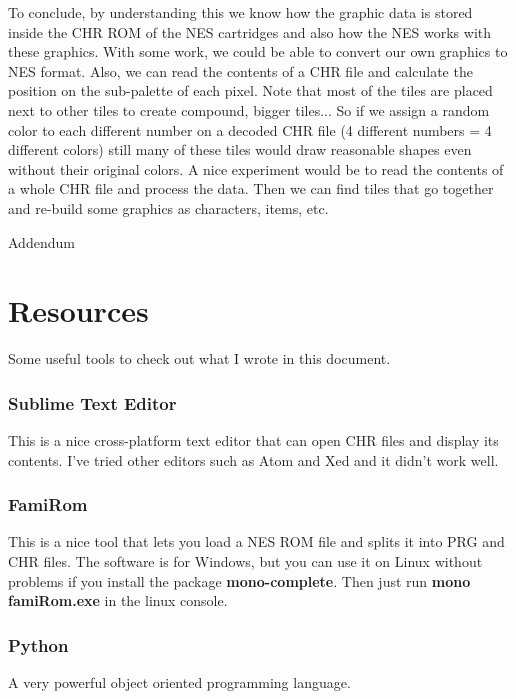 \documentclass{article}
\begin{document}
\vskip 0.2in

To conclude, by understanding this we know how the graphic data is stored inside the CHR ROM of the NES cartridges and also how the NES works with these graphics. With some work, we could be able to convert our own graphics to NES format. Also, we can read the contents of a CHR file and calculate the position on the sub-palette of each pixel. Note that most of the tiles are placed next to other tiles to create compound, bigger tiles... So if we assign a random color to each different number on a decoded CHR file (4 different numbers = 4 different colors) still many of these tiles would draw reasonable shapes even without their original colors. A nice experiment would be to read the contents of a whole CHR file and process the data. Then we can find tiles that go together and re-build some graphics as characters, items, etc.

\newpage

{\Huge Addendum}

\section*{Resources}

Some useful tools to check out what I wrote in this document.

\subsubsection*{Sublime Text Editor}
This is a nice cross-platform text editor that can open CHR files and display its contents. I've tried other editors such as Atom and Xed and it didn't work well.

\subsubsection*{FamiRom}

This is a nice tool that lets you load a NES ROM file and splits it into PRG and CHR files. The software is for Windows, but you can use it on Linux without problems if you install the package \textbf{mono-complete}. Then just run \textbf{mono famiRom.exe} in the linux console.

\subsubsection*{Python}

A very powerful object oriented programming language.
\end{document}
